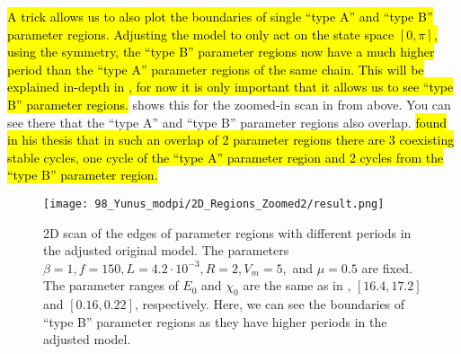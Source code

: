 \hl{
	A trick allows us to also plot the boundaries of single ``type A'' and ``type B'' parameter regions.
	Adjusting the model to only act on the state space $[0, \pi]$, using the symmetry, the ``type B'' parameter regions now have a much higher period than the ``type A'' parameter regions of the same chain.
	This will be explained in-depth in , for now it is only important that it allows us to see ``type B'' parameter regions.
}
 shows this for the zoomed-in scan in  from above.
You can see there that the ``type A'' and ``type B'' parameter regions also overlap.
\hl{
	 found in his thesis that in such an overlap of 2 parameter regions there are 3 coexisting stable cycles, one cycle of the ``type A'' parameter region and 2 cycles from the ``type B'' parameter region.
}

\begin{figure}
	\centering
	\texttt{[image: 98\_Yunus\_modpi/2D\_Regions\_Zoomed2/result.png]}
	\caption[2D scan of the edges of parameter regions with different periods in the adjusted original model]{
		2D scan of the edges of parameter regions with different periods in the adjusted original model.
		The parameters $\beta = 1, f = 150, L = 4.2 \cdot 10^{-3}, R = 2, V_m = 5,$ and $\mu = 0.5$ are fixed.
		The parameter ranges of $E_0$ and $\chi_0$ are the same as in , $[16.4, 17.2]$ and $[0.16, 0.22]$, respectively.
		Here, we can see the boundaries of ``type B'' parameter regions as they have higher periods in the adjusted model.
	}
	\label{fig:etup.og.overlapping.regions.zoomed}
\end{figure}
